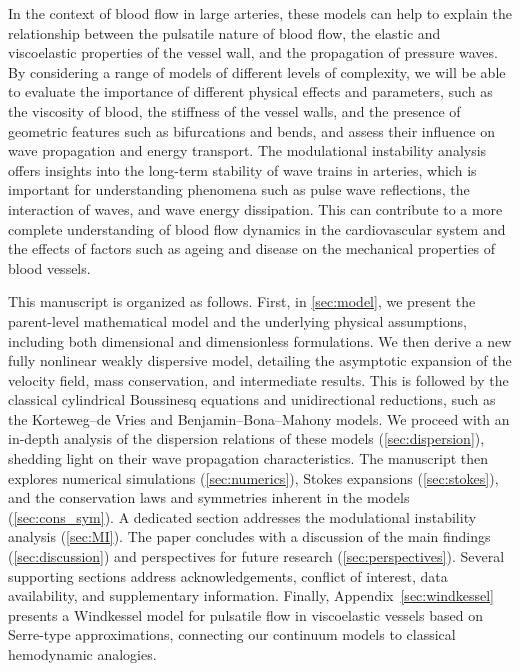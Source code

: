 \documentclass[alpha-refs, 12pt]{wiley-article}
\begin{document}
In the context of blood flow in large arteries, these models can help to explain the relationship between the pulsatile nature of blood flow, the elastic and viscoelastic properties of the vessel wall, and the propagation of pressure waves. By considering a range of models of different levels of complexity, we will be able to evaluate the importance of different physical effects and parameters, such as the viscosity of blood, the stiffness of the vessel walls, and the presence of geometric features such as bifurcations and bends, and assess their influence on wave propagation and energy transport. The modulational instability analysis offers insights into the long-term stability of wave trains in arteries, which is important for understanding phenomena such as pulse wave reflections, the interaction of waves, and wave energy dissipation. This can contribute to a more complete understanding of blood flow dynamics in the cardiovascular system and the effects of factors such as ageing and disease on the mechanical properties of blood vessels.

This manuscript is organized as follows. First, in \cref{sec:model}, we present the parent-level mathematical model and the underlying physical assumptions, including both dimensional and dimensionless formulations. We then derive a new fully nonlinear weakly dispersive model, detailing the asymptotic expansion of the velocity field, mass conservation, and intermediate results. This is followed by the classical cylindrical Boussinesq equations and unidirectional reductions, such as the Korteweg--de Vries and Benjamin--Bona--Mahony models. We proceed with an in-depth analysis of the dispersion relations of these models (\cref{sec:dispersion}), shedding light on their wave propagation characteristics. The manuscript then explores numerical simulations (\cref{sec:numerics}), Stokes expansions (\cref{sec:stokes}), and the conservation laws and symmetries inherent in the models (\cref{sec:cons_sym}). A dedicated section addresses the modulational instability analysis (\cref{sec:MI}). The paper concludes with a discussion of the main findings (\cref{sec:discussion}) and perspectives for future research (\cref{sec:perspectives}). Several supporting sections address acknowledgements, conflict of interest, data availability, and supplementary information. Finally, Appendix~\ref{sec:windkessel} presents a Windkessel model for pulsatile flow in viscoelastic vessels based on Serre-type approximations, connecting our continuum models to classical hemodynamic analogies.
\end{document}
